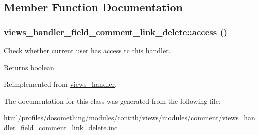 \subsection{Member Function Documentation}
\hypertarget{classviews__handler__field__comment__link__delete_ad37af388e723047cc0f727d471ca6efb}{
\subsubsection[{access}]{\setlength{\rightskip}{0pt plus 5cm}views\_\-handler\_\-field\_\-comment\_\-link\_\-delete::access ()}}
\label{classviews__handler__field__comment__link__delete_ad37af388e723047cc0f727d471ca6efb}
Check whether current user has access to this handler.

\begin{DoxyReturn}{Returns}
boolean 
\end{DoxyReturn}


Reimplemented from \hyperlink{classviews__handler_a3f2fbfe1e0849d06ae77149412b821f6}{views\_\-handler}.

The documentation for this class was generated from the following file:\begin{DoxyCompactItemize}
\item 
html/profiles/dosomething/modules/contrib/views/modules/comment/\hyperlink{views__handler__field__comment__link__delete_8inc}{views\_\-handler\_\-field\_\-comment\_\-link\_\-delete.inc}\end{DoxyCompactItemize}
